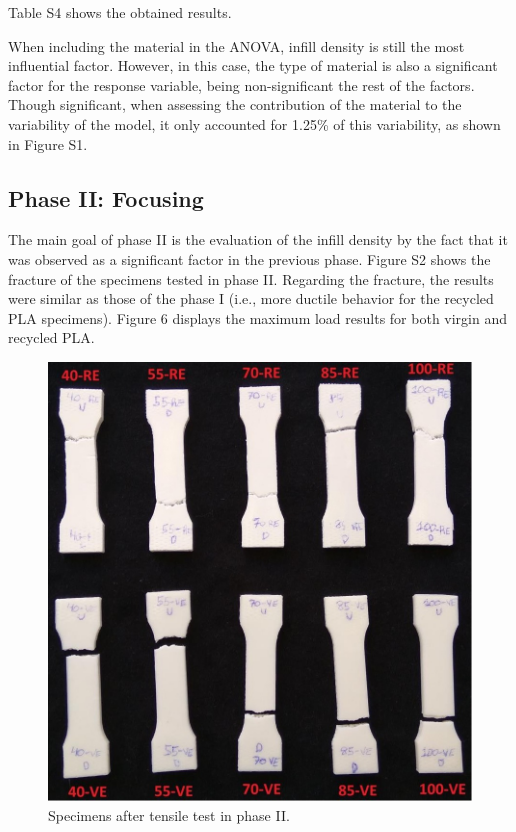 \documentclass[conference,final,]{IEEEtran}
\begin{document}
Table S4 shows the obtained results.

When including the material in the ANOVA, infill density is still the
most influential factor. However, in this case, the type of material is
also a significant factor for the response variable, being
non-significant the rest of the factors. Though significant, when
assessing the contribution of the material to the variability of the
model, it only accounted for 1.25\% of this variability, as shown in
Figure S1.

\hypertarget{phase-ii-focusing}{%
\subsection{Phase II: Focusing}\label{phase-ii-focusing}}

The main goal of phase II is the evaluation of the infill density by the
fact that it was observed as a significant factor in the previous phase.
Figure S2 shows the fracture of the specimens tested in phase II.
Regarding the fracture, the results were similar as those of the phase I
(i.e., more ductile behavior for the recycled PLA specimens). Figure 6
displays the maximum load results for both virgin and recycled PLA.

\begin{figure}

{\centering \includegraphics[width=0.8\linewidth]{Figures/Probetas-Fase-2} 

}

\caption{Specimens after tensile test in  phase II.}\label{fig:Fig.Probetas.Fase.2}
\end{figure}
\end{document}
